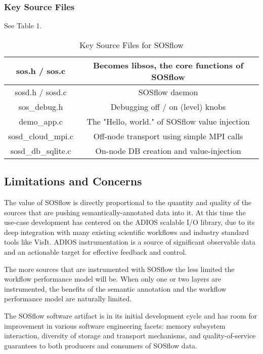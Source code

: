 \subsubsection{Key Source Files}
See Table 1.

\begin{table}[!t]
\renewcommand{\arraystretch}{1.3}
\caption{Key Source Files for SOSflow}
\label{table_example}
\centering
\begin{tabular}{|c|c|}
\hline %
sos.h / sos.c & Becomes libsos, the core functions of SOSflow\\
\hline %
sosd.h / sosd.c & SOSflow daemon\\
\hline %
sos\_debug.h & Debugging off / on (level) knobs\\
\hline %
demo\_app.c & The "Hello, world." of SOSflow value injection\\
\hline %
sosd\_cloud\_mpi.c & Off-node transport using simple MPI calls\\
\hline %
sosd\_db\_sqlite.c & On-node DB creation and value-injection\\
\hline %
\end{tabular}
\end{table}

\subsection{Limitations and Concerns}
The value of SOSflow is directly proportional to the quantity and
quality of the sources that are pushing semantically-annotated data
into it. At this time the use-case development has centered on the
ADIOS scalable I/O library, due to its deep integration with many
existing scientific workflows and industry standard tools like
VisIt. ADIOS instrumentation is a source of significant observable
data and an actionable target for effective feedback and control.

The more sources that are instrumented with SOSflow the less limited
the workflow performance model will be. When only one or two layers
are instrumented, the benefits of the semantic annotation and the
workflow performance model are naturally limited.

The SOSflow software artifact is in its initial development cycle and
has room for improvement in various software engineering facets:
memory subsystem interaction, diversity of storage and transport
mechanisms, and quality-of-service guarantees to both producers and
consumers of SOSflow data.

